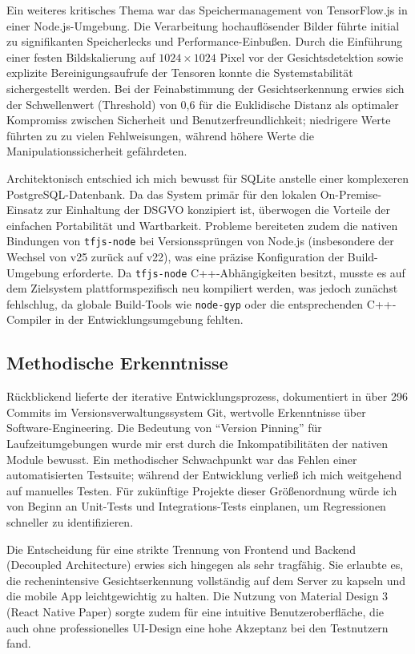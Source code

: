 Ein weiteres kritisches Thema war das Speichermanagement von TensorFlow.js in einer Node.js-Umgebung. Die Verarbeitung hochauflösender Bilder führte initial zu signifikanten Speicherlecks und Performance-Einbußen. Durch die Einführung einer festen Bildskalierung auf $1024 \times 1024$ Pixel vor der Gesichtsdetektion sowie explizite Bereinigungsaufrufe der Tensoren konnte die Systemstabilität sichergestellt werden. Bei der Feinabstimmung der Gesichtserkennung erwies sich der Schwellenwert (Threshold) von 0,6 für die Euklidische Distanz als optimaler Kompromiss zwischen Sicherheit und Benutzerfreundlichkeit; niedrigere Werte führten zu zu vielen Fehlweisungen, während höhere Werte die Manipulationssicherheit gefährdeten.

Architektonisch entschied ich mich bewusst für SQLite anstelle einer komplexeren PostgreSQL-Datenbank. Da das System primär für den lokalen On-Premise-Einsatz zur Einhaltung der DSGVO konzipiert ist, überwogen die Vorteile der einfachen Portabilität und Wartbarkeit. Probleme bereiteten zudem die nativen Bindungen von \texttt{tfjs-node} bei Versionssprüngen von Node.js (insbesondere der Wechsel von v25 zurück auf v22), was eine präzise Konfiguration der Build-Umgebung erforderte. Da \texttt{tfjs-node} C++-Abhängigkeiten besitzt, musste es auf dem Zielsystem plattformspezifisch neu kompiliert werden, was jedoch zunächst fehlschlug, da globale Build-Tools wie \texttt{node-gyp} oder die entsprechenden C++-Compiler in der Entwicklungsumgebung fehlten.

\subsection{Methodische Erkenntnisse}
Rückblickend lieferte der iterative Entwicklungsprozess, dokumentiert in über 296 Commits im Versionsverwaltungssystem Git, wertvolle Erkenntnisse über Software-Engineering. Die Bedeutung von \enquote{Version Pinning} für Laufzeitumgebungen wurde mir erst durch die Inkompatibilitäten der nativen Module bewusst. Ein methodischer Schwachpunkt war das Fehlen einer automatisierten Testsuite; während der Entwicklung verließ ich mich weitgehend auf manuelles Testen. Für zukünftige Projekte dieser Größenordnung würde ich von Beginn an Unit-Tests und Integrations-Tests einplanen, um Regressionen schneller zu identifizieren.

Die Entscheidung für eine strikte Trennung von Frontend und Backend (Decoupled Architecture) erwies sich hingegen als sehr tragfähig. Sie erlaubte es, die rechenintensive Gesichtserkennung vollständig auf dem Server zu kapseln und die mobile App leichtgewichtig zu halten. Die Nutzung von Material Design 3 (React Native Paper) sorgte zudem für eine intuitive Benutzeroberfläche, die auch ohne professionelles UI-Design eine hohe Akzeptanz bei den Testnutzern fand.

